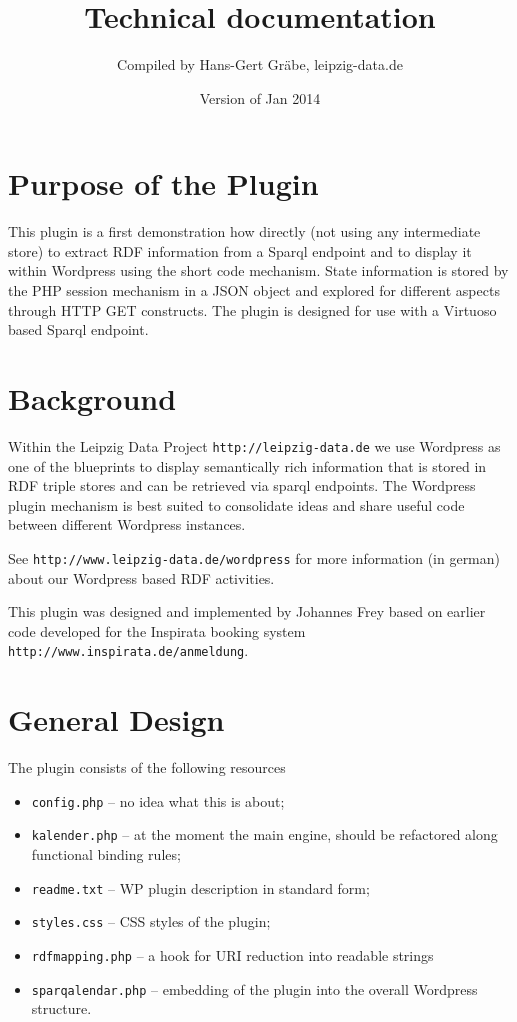 \documentclass[11pt,a4paper]{article}
\title{Technical documentation}
\author{Compiled by Hans-Gert Gr\"abe, leipzig-data.de}
\date{Version of Jan 2014}
\begin{document}
\maketitle

\section{Purpose of the Plugin}

This plugin is a first demonstration how directly (not using any intermediate
store) to extract RDF information from a Sparql endpoint and to display it
within Wordpress using the short code mechanism.  State information is stored
by the PHP session mechanism in a JSON object and explored for different
aspects through HTTP GET constructs. The plugin is designed for use with a
Virtuoso based Sparql endpoint.

\section{Background}

Within the Leipzig Data Project \texttt{http://leipzig-data.de} we use
Wordpress as one of the blueprints to display semantically rich information
that is stored in RDF triple stores and can be retrieved via sparql endpoints.
The Wordpress plugin mechanism is best suited to consolidate ideas and share
useful code between different Wordpress instances.

See \texttt{http://www.leipzig-data.de/wordpress} for more information (in
german) about our Wordpress based RDF activities.

This plugin was designed and implemented by Johannes Frey based on earlier
code developed for the Inspirata booking system
\texttt{http://www.inspirata.de/anmeldung}.

\section{General Design}

The plugin consists of the following resources
\begin{itemize}
\item \texttt{config.php} -- no idea what this is about;        
\item \texttt{kalender.php} -- at the moment the main engine, should be
  refactored along functional binding rules;
\item \texttt{readme.txt} -- WP plugin description in standard form;
\item \texttt{styles.css} -- CSS styles of the plugin;
\item \texttt{rdfmapping.php} -- a hook for URI reduction into readable
  strings
\item \texttt{sparqalendar.php} -- embedding of the plugin into the overall
  Wordpress structure.
\end{itemize}
\end{document}
